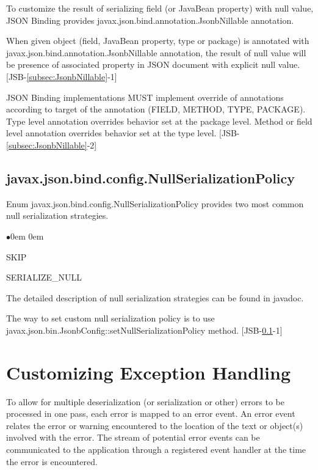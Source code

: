 To customize the result of serializing field (or JavaBean property) with null value, JSON Binding provides javax.json.bind.annotation.JsonbNillable annotation.

When given object (field, JavaBean property, type or package) is annotated with javax.json.bind.annotation.JsonbNillable annotation, the result of null value will be presence of associated property in JSON document with explicit null value. [JSB-\ref{subsec:JsonbNillable}-1]

JSON Binding implementations MUST implement override of annotations according to target of the annotation (FIELD, METHOD, TYPE, PACKAGE). Type level annotation overrides behavior set at the package level. Method or field level annotation overrides behavior set at the type level. [JSB-\ref{subsec:JsonbNillable}-2]

\subsection{javax.json.bind.config.NullSerializationPolicy}
\label{subsec:NullSerializationPolicy}

Enum javax.json.bind.config.NullSerializationPolicy provides two most common null serialization strategies.

\begin{list}{$\bullet$}{\parsep 0em  0em}
\item SKIP
\item SERIALIZE\_NULL
\end{list}

The detailed description of null serialization strategies can be found in javadoc.

The way to set custom null serialization policy is to use javax.json.bin.JsonbConfig::setNullSerializationPolicy method. [JSB-\ref{subsec:NullSerializationPolicy}-1]

\section{Customizing Exception Handling}
\label{sec:custom_exception_handling}

To allow for multiple deserialization (or serialization or other) errors to be processed in one pass, each error is mapped to an error event. An error event relates the error or warning encountered to the location of the text or object(s) involved with the error. The stream of potential error events can be communicated to the application through a registered event handler at the time the error is encountered.

